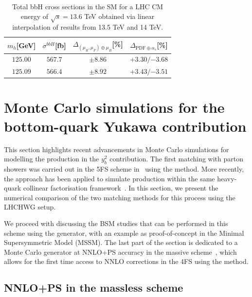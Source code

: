 \documentclass[11pt,a4paper]{article}
\begin{document}
\begin{table}[ht!]
\begin{center}%
\begin{small}%
\begin{tabular}{cccc}%
$m_h$[GeV] & $\sigma^{bbH}$[fb] & $\Delta_{\left(\mu_{R},\mu_{F}\right)\oplus\mu_{B}}$[\%] & $\Delta_{\mathrm{PDF}\oplus\alpha_s}$[\%]  \\\hline
$125.00$ & $567.7$ & $\pm8.86$ & ${{+3.30}}/{-3.68}$ \\
$125.09$ & $566.4$ & $\pm8.92$ & ${{+3.43}}/{-3.51}$ 
\end{tabular}%
\end{small}%
\end{center}%
\caption{Total bbH{} cross sections in the SM for a LHC CM energy of $\sqrt{s}=13.6$ TeV obtained via linear interpolation of results from 13.5 TeV and 14 TeV.}
\label{tab:bbH136linalt}
\end{table}


\section{Monte Carlo simulations for the bottom-quark Yukawa contribution}
This section highlights recent advancements in Monte Carlo simulations for modelling the \bbH{} production in the $y_b^2$ contribution. The first matching with parton showers was carried out in the 5FS scheme in~ using the \minnlo{} method. More recently, the \GENEVA{} approach has been applied to simulate \bbtoH{} production within the same heavy-quark collinear factorisation framework~\cite{Gavardi:2025zpf}. In this section, we present the numerical comparison of the two matching methods for this process using the LHCHWG setup.

We proceed with discussing the BSM studies that can be performed in this scheme using the \minnlo{} generator, with an example as proof-of-concept in the Minimal Supersymmetric Model (MSSM). The last part of the section is dedicated to a Monte Carlo generator at NNLO+PS accuracy in the massive scheme~\cite{Biello:2024pgo}, which allows for the first time access to NNLO corrections in the 4FS using the \minnlo{} method.

\subsection{NNLO+PS in the massless scheme}\label{sec:5FSNNLOPS}
\end{document}
